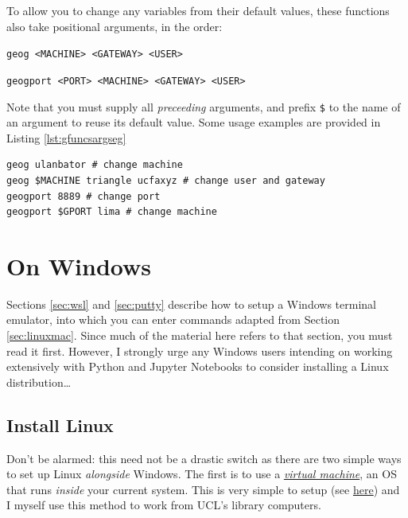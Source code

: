 \documentclass[a4paper]{article}
\begin{document}
To allow you to change any variables from their default values, these functions also take positional arguments, in the order:

\texttt{geog \textless{}MACHINE\textgreater{} \textless{}GATEWAY\textgreater{} \textless{}USER\textgreater{}}
{}

\texttt{geogport \textless{}PORT\textgreater{} \textless{}MACHINE\textgreater{} \textless{}GATEWAY\textgreater{} \textless{}USER\textgreater{}}

Note that you must supply all \emph{preceeding} arguments, and prefix \texttt{\$} to the name of an argument to reuse its default value. Some usage examples are provided in Listing \ref{lst:gfuncsargseg}

\begin{lstlisting}[caption={Examples of arguments to geography login/tunnel functions}, label={lst:gfuncsargseg}]
geog ulanbator # change machine
geog $MACHINE triangle ucfaxyz # change user and gateway
geogport 8889 # change port
geogport $GPORT lima # change machine
\end{lstlisting}

\section{On Windows}
\label{sec:windows}

Sections \ref{sec:wsl} and \ref{sec:putty} describe how to setup a Windows terminal emulator, into which you can enter commands adapted from Section \ref{sec:linuxmac}.
Since much of the material here refers to that section, you must read it first.
However, I strongly urge any Windows users intending on working extensively with Python and Jupyter Notebooks to consider installing a Linux distribution\ldots

\subsection{Install Linux}
\label{sec:win2lnx}
Don't be alarmed: this need not be a drastic switch as there are two simple ways to set up Linux \emph{alongside} Windows.
The first is to use a \emph{\href{https://www.howtogeek.com/196060/beginner-geek-how-to-create-and-use-virtual-machines/}{virtual machine}}, an OS that runs \emph{inside} your current system.
This is very simple to setup (see \href{http://www.storagecraft.com/blog/the-dead-simple-guide-to-installing-a-linux-virtual-machine-on-windows/}{here}) and I myself use this method to work from UCL's library computers.
\end{document}
